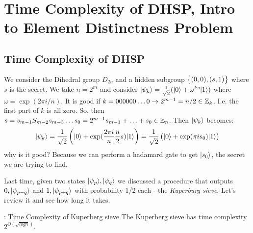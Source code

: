\section{Time Complexity of DHSP, Intro to Element Distinctness Problem}
\subsection*{Time Complexity of DHSP}
We consider the Dihedral group $D_{2n}$ and a hidden subgroup $\set{(0, 0), (s, 1)}$ where $s$ is the secret. We take $n = 2^m$ and consider $\lvert \psi_k \rangle = \frac{1}{\sqrt{2}}(\lvert 0 \rangle + \omega^{ks}\lvert 1 \rangle)$ where $\omega=\exp(2\pi i/n)$. It is good if $k = 000000\ldots 0 \to 2^{m-1} = n/2 \in \mathbb{Z}_k$. I.e. the first part of $k$ is all zero. So, then $s = s_{m-1}S_{m-2}s_{m-3}\ldots s_0 = 2^{m-1}s_{m-1} + \ldots + s_0 \in \mathbb{Z}_n$. Then $\lvert \psi_k \rangle$ becomes:
\begin{equation}
    \lvert \psi_k \rangle = \frac{1}{\sqrt{2}}\left(\lvert 0 \rangle + \exp(\frac{2\pi i}{n}\frac{n}{2}s)\lvert 1 \rangle\right) = \frac{1}{\sqrt{2}}\left(\lvert 0 \rangle + \exp(\pi i s_0)\lvert 1 \rangle\right)
\end{equation}
why is it good? Because we can perform a hadamard gate to get $\lvert s_0 \rangle$, the secret we are trying to find.

Last time, given two states $\lvert \psi_p \rangle, \lvert \psi_q \rangle$ we discussed a procedure that outputs $0, \lvert \psi_{p-q} \rangle$ and $1, \lvert \psi_{p+q} \rangle$ with probability 1/2 each - the \emph{Kuperburg sieve}. Let's review it and see how long it takes.

\begin{propbox}{: Time Complexity of Kuperberg sieve}
    The Kuperberg sieve has time complexity $2^{O(\sqrt{log n})}$.
\end{propbox}

